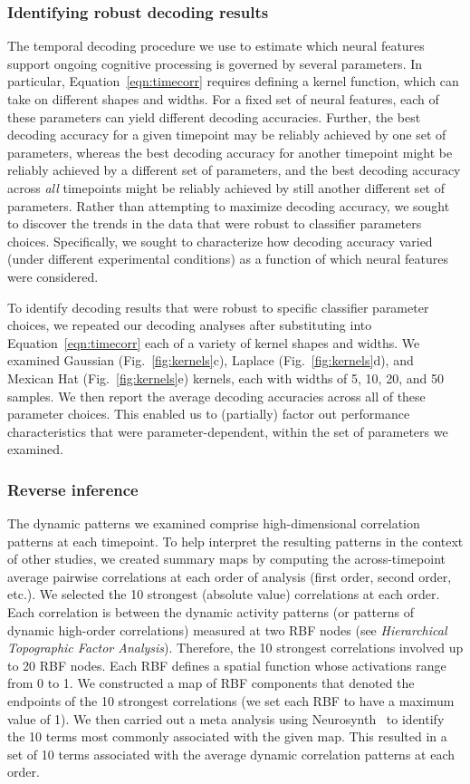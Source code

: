 \documentclass[english]{article}
\begin{document}
\subsubsection*{Identifying robust decoding results}
The temporal decoding procedure we use to estimate which neural
features support ongoing cognitive processing is governed by several
parameters. In particular, Equation~\ref{eqn:timecorr} requires
defining a kernel function, which can take on different shapes and
widths.  For a fixed set of neural features, each of these parameters
can yield different decoding accuracies.  Further, the best decoding
accuracy for a given timepoint may be reliably achieved by one set of
parameters, whereas the best decoding accuracy for another timepoint
might be reliably achieved by a different set of parameters, and the
best decoding accuracy across \textit{all} timepoints might be
reliably achieved by still another different set of parameters.
Rather than attempting to maximize decoding accuracy, we sought to
discover the trends in the data that were robust to classifier
parameters choices.  Specifically, we sought to characterize how
decoding accuracy varied (under different experimental conditions) as
a function of which neural features were considered.

To identify decoding results that were robust to specific classifier
parameter choices, we repeated our decoding analyses after
substituting into Equation~\ref{eqn:timecorr} each of a variety of
kernel shapes and widths.  We examined Gaussian
(Fig.~\ref{fig:kernels}c), Laplace (Fig.~\ref{fig:kernels}d), and
Mexican Hat (Fig.~\ref{fig:kernels}e) kernels, each with widths of 5,
10, 20, and 50 samples.  We then report the average decoding
accuracies across all of these parameter choices.  This enabled us to
(partially) factor out performance characteristics that were
parameter-dependent, within the set of parameters we examined.


\subsubsection*{Reverse inference}
The dynamic patterns we examined comprise high-dimensional correlation
patterns at each timepoint.  To help interpret the resulting patterns
in the context of other studies, we created summary maps by computing
the across-timepoint average pairwise correlations at each order of
analysis (first order, second order, etc.).  We selected the 10
strongest (absolute value) correlations at each order.  Each
correlation is between the dynamic activity patterns (or patterns of
dynamic high-order correlations) measured at two RBF nodes (see
\textit{Hierarchical Topographic Factor Analysis}).  Therefore, the 10
strongest correlations involved up to 20 RBF nodes.  Each RBF defines
a spatial function whose activations range from 0 to 1.  We
constructed a map of RBF components that denoted the endpoints of the
10 strongest correlations (we set each RBF to have a maximum value of
1).  We then carried out a meta analysis using
Neurosynth~\citep{RubiEtal17} to identify the 10 terms most commonly
associated with the given map.  This resulted in a set of 10 terms
associated with the average dynamic correlation patterns at each
order.
\end{document}
